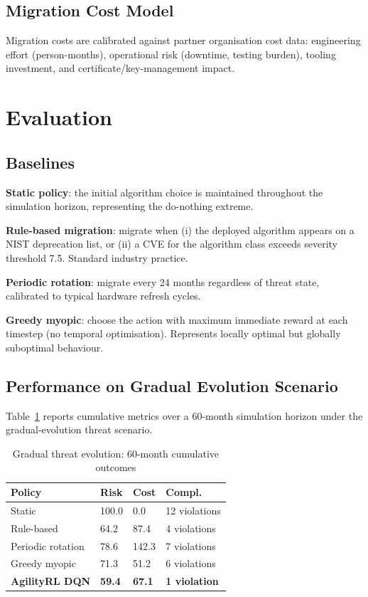 \documentclass[sigconf,nonacm]{acmart}
\begin{document}
\subsection{Migration Cost Model}

Migration costs are calibrated against partner organisation cost data:
engineering effort (person-months), operational risk (downtime,
testing burden), tooling investment, and certificate/key-management
impact.

\section{Evaluation}

\subsection{Baselines}

\textbf{Static policy}: the initial algorithm choice is maintained
throughout the simulation horizon, representing the do-nothing
extreme.

\textbf{Rule-based migration}: migrate when (i) the deployed algorithm
appears on a NIST deprecation list, or (ii) a CVE for the algorithm
class exceeds severity threshold 7.5. Standard industry practice.

\textbf{Periodic rotation}: migrate every 24 months regardless of
threat state, calibrated to typical hardware refresh cycles.

\textbf{Greedy myopic}: choose the action with maximum immediate
reward at each timestep (no temporal optimisation). Represents
locally optimal but globally suboptimal behaviour.

\subsection{Performance on Gradual Evolution Scenario}

Table~\ref{tab:gradual} reports cumulative metrics over a 60-month
simulation horizon under the gradual-evolution threat scenario.

\begin{table}[h]
\caption{Gradual threat evolution: 60-month cumulative outcomes}
\label{tab:gradual}
\small
\begin{tabularx}{\columnwidth}{@{}p{2.4cm}X X X@{}}
\toprule
\textbf{Policy} & \textbf{Risk} & \textbf{Cost} & \textbf{Compl.} \\
\midrule
Static                 & 100.0 & 0.0   & 12 violations \\
Rule-based             & 64.2  & 87.4  & 4 violations \\
Periodic rotation      & 78.6  & 142.3 & 7 violations \\
Greedy myopic          & 71.3  & 51.2  & 6 violations \\
\textbf{AgilityRL DQN} & \textbf{59.4} & \textbf{67.1} & \textbf{1 violation} \\
\bottomrule
\end{tabularx}
\end{table}
\end{document}
